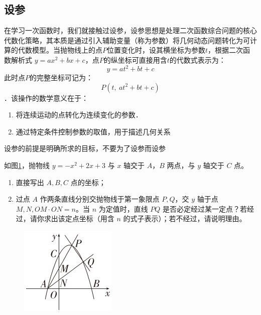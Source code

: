 \subsection{设参}
在学习一次函数时，我们就接触过设参，设参思想是处理二次函数综合问题的核心代数化策略，其本质是通过引入辅助变量（称为参数）将几何动态问题转化为可计算的代数模型。当抛物线上的点$P$位置变化时，设其横坐标为参数$t$，根据二次函数解析式 $y = ax^2 + bx + c$，点$P$的纵坐标可直接用含$t$的代数式表示为：
\[
y = at^2 + bt + c
\]
此时点$P$的完整坐标可记为：
\[
P(t,\  at^2 + bt + c)
\]．该操作的数学意义在于：
\begin{enumerate}
    \item 将连续运动的点转化为连续变化的参数．
    \item 通过特定条件控制参数的取值，用于描述几何关系
\end{enumerate}
\begin{remark}
设参的前提是明确所求的目标，不要为了设参而设参    
\end{remark}


\begin{example}
如图\ref{fig:sp1}，抛物线 \( y = -x^2 + 2x + 3 \) 与 \( x \) 轴交于 \( A \)，\( B \) 两点，与 \( y \) 轴交于 \( C \) 点。
\begin{enumerate}
    \item 直接写出 \( A, B, C \) 点的坐标；  
    \item 过点 \( A \) 作两条直线分别交抛物线于第一象限点 \( P, Q \)，交 \( y \) 轴于点 \( M, N, OM \cdot ON = n \)。当 \( n \) 为定值时，直线 \( PQ \) 是否必定经过某一定点？若经过，请你求出该定点坐标（用含 \( n \) 的式子表示）；若不经过，请说明理由。
\end{enumerate}
\end{example}

\begin{figure}
    \includegraphics[width=1\linewidth]{figure/设参题1.png}
    \caption{}
    \label{fig:sp1}
\end{figure}

